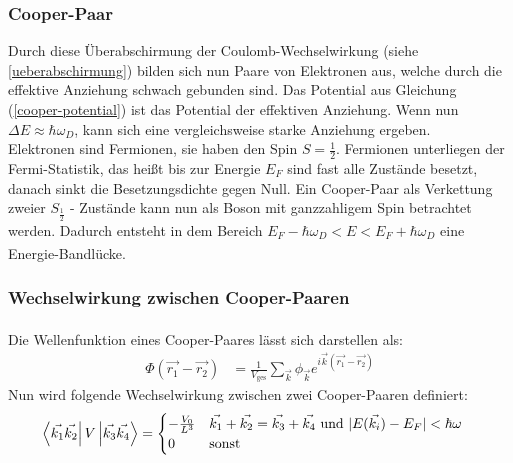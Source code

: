 \documentclass[12pt]{article}
\begin{document}
\subsubsection{Cooper-Paar}
Durch diese Überabschirmung der Coulomb-Wechselwirkung (siehe \ref{ueberabschirmung}) bilden sich nun Paare von Elektronen aus, welche durch die effektive Anziehung schwach gebunden sind. Das Potential aus Gleichung (\ref{cooper-potential}) ist das Potential der effektiven Anziehung. Wenn nun $\Delta E\approx\hbar\omega_D$, kann sich eine vergleichsweise starke Anziehung ergeben.\\

Elektronen sind Fermionen, sie haben den Spin $S=\frac12$. Fermionen unterliegen der Fermi-Statistik, das heißt bis zur Energie $E_F$ sind fast alle Zustände besetzt, danach sinkt die Besetzungsdichte gegen Null.
Ein Cooper-Paar als Verkettung zweier $S_\frac12$ - Zustände kann nun als Boson mit ganzzahligem Spin betrachtet werden. Dadurch entsteht in dem Bereich $E_F-\hbar\omega_D<E<E_F+\hbar\omega_D$ eine Energie-Bandlücke.\textsuperscript{\cite{SQUID}}
\subsubsection{Wechselwirkung zwischen Cooper-Paaren}
Die Wellenfunktion eines Cooper-Paares lässt sich darstellen als: \textsuperscript{\cite{anleitung}}
\begin{align}
	\Phi(\vec{r_1}-\vec{r_2})&=\frac1{V_{\mathrm{ges}}}\sum_{\vec k}\phi_{\vec k}e^{i\vec k(\vec{r_1}-\vec{r_2})}
\end{align}
Nun wird folgende Wechselwirkung zwischen zwei Cooper-Paaren definiert:
\begin{align}
	\bra{\vec{k_1}\vec{k_2}}V\ket{\vec{k_3}\vec{k_4}}&=\begin{cases}-\frac{V_0}{L^3}&\vec{k_1}+\vec{k_2}=\vec{k_3}+\vec{k_4} \text{ und }|E(\vec{k_i})-E_F|<\hbar\omega\\0&\text{sonst}\end{cases}
\end{align}
\end{document}
